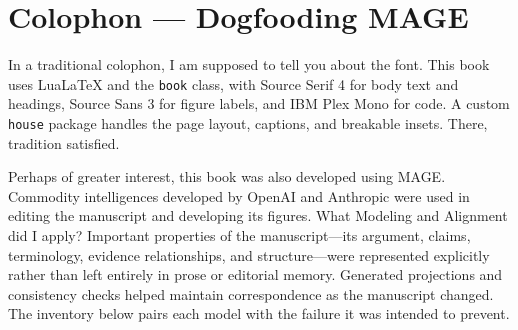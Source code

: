


\chapter{Colophon --- Dogfooding MAGE}

In a traditional colophon, I am supposed to tell you about the font. This book uses LuaLaTeX and the \texttt{book} class, with Source Serif 4 for body text and headings, Source Sans 3 for figure labels, and IBM Plex Mono for code. A custom \texttt{house} package handles the page layout, captions, and breakable insets. There, tradition satisfied.

Perhaps of greater interest, this book was also developed using MAGE. Commodity intelligences developed by OpenAI and Anthropic were used in editing the manuscript and developing its figures. What Modeling and Alignment did I apply? Important properties of the manuscript---its argument, claims, terminology, evidence relationships, and structure---were represented explicitly rather than left entirely in prose or editorial memory. Generated projections and consistency checks helped maintain correspondence as the manuscript changed. The inventory below pairs each model with the failure it was intended to prevent.

